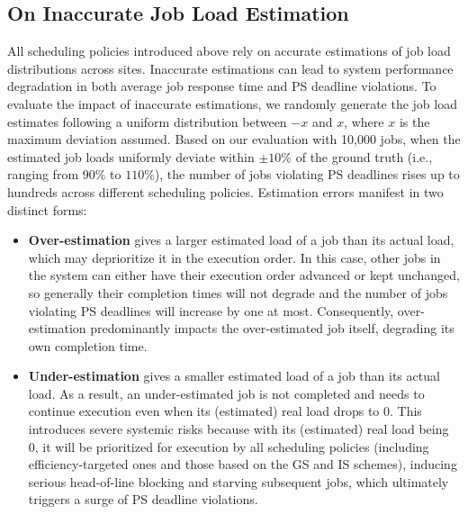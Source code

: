 \subsection{On Inaccurate Job Load Estimation}

All scheduling policies introduced above rely on accurate estimations of job load distributions across sites. Inaccurate estimations can lead to system performance degradation in both average job response time and PS deadline violations. To evaluate the impact of inaccurate estimations, we randomly generate the job load estimates following a uniform distribution between $-x$ and $x$, where $x$ is the maximum deviation assumed. Based on our evaluation with 10,000 jobs, when the estimated job loads uniformly deviate within $\pm10\%$ of the ground truth (i.e., ranging from $90\%$ to $110\%$), the number of jobs violating PS deadlines rises up to hundreds across different scheduling policies. Estimation errors manifest in two distinct forms:

\begin{itemize}[leftmargin=*]
    \item \textbf{Over-estimation} gives a larger estimated load of a job than its actual load, which may deprioritize it in the execution order. In this case, other jobs in the system can either have their execution order advanced or kept unchanged, so generally their completion times will not degrade and the number of jobs violating PS deadlines will increase by one at most. Consequently, over-estimation predominantly impacts the over-estimated job itself, degrading its own completion time.%
    
    \item \textbf{Under-estimation} gives a smaller estimated load of a job than its actual load. As a result, an under-estimated job is not completed and needs to continue execution even when its (estimated) real load drops to 0. This introduces severe systemic risks because with its (estimated) real load being 0, it will be prioritized for execution by all scheduling policies (including efficiency-targeted ones and those based on the GS and IS schemes), inducing serious head-of-line blocking and starving subsequent jobs, which ultimately triggers a surge of PS deadline violations.
\end{itemize}

